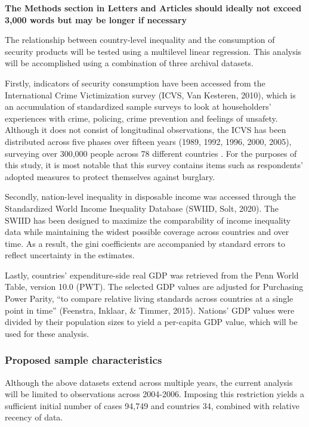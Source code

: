 \documentclass[
  english,
  man]{apa6}
\begin{document}
\textbf{The Methods section in Letters and Articles should ideally not exceed 3,000 words but may be longer if necessary}

The relationship between country-level inequality and the consumption of security products will be tested using a multilevel linear regression. This analysis will be accomplished using a combination of three archival datasets.

Firstly, indicators of security consumption have been accessed from the International Crime Victimization survey (ICVS, Van Kesteren, 2010), which is an accumulation of standardized sample surveys to look at householders' experiences with crime, policing, crime prevention and feelings of unsafety. Although it does not consist of longitudinal observations, the ICVS has been distributed across five phases over fifteen years (1989, 1992, 1996, 2000, 2005), surveying over 300,000 people across 78 different countries . For the purposes of this study, it is most notable that this survey contains items such as respondents' adopted measures to protect themselves against burglary.

Secondly, nation-level inequality in disposable income was accessed through the Standardized World Income Inequality Database (SWIID, Solt, 2020). The SWIID has been designed to maximize the comparability of income inequality data while maintaining the widest possible coverage across countries and over time. As a result, the gini coefficients are accompanied by standard errors to reflect uncertainty in the estimates.

Lastly, countries' expenditure-side real GDP was retrieved from the Penn World Table, version 10.0 (PWT). The selected GDP values are adjusted for Purchasing Power Parity, ``to compare relative living standards across countries at a single point in time'' (Feenstra, Inklaar, \& Timmer, 2015). Nations' GDP values were divided by their population sizes to yield a per-capita GDP value, which will be used for these analysis.

\hypertarget{proposed-sample-characteristics}{%
\subsubsection{Proposed sample characteristics}\label{proposed-sample-characteristics}}

Although the above datasets extend across multiple years, the current analysis will be limited to observations across 2004-2006. Imposing this restriction yields a sufficient initial number of cases 94,749 and countries 34, combined with relative recency of data.
\end{document}
